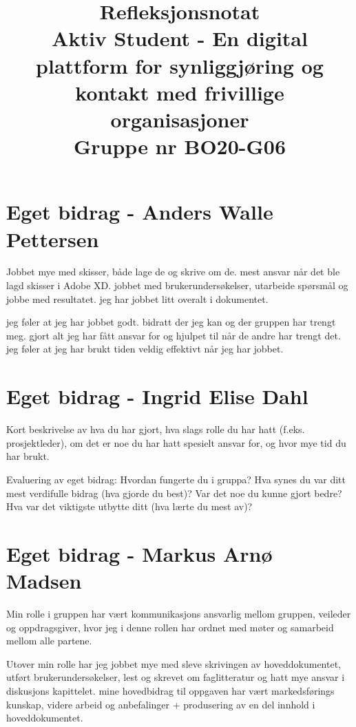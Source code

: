 \documentclass[11pt,a4paper]{report}
\begin{document}
\title{
Refleksjonsnotat \\
\vspace{2cm}
Aktiv Student - En digital plattform for synliggjøring og kontakt med frivillige organisasjoner\\
Gruppe nr BO20-G06
}

\maketitle

\section*{Eget bidrag - Anders Walle Pettersen}
Jobbet mye med skisser, både lage de og skrive om de. mest ansvar når det ble lagd skisser i Adobe XD. jobbet med brukerundersøkelser, utarbeide spørsmål og jobbe med resultatet. jeg har jobbet litt overalt i dokumentet. 

jeg føler at jeg har jobbet godt. bidratt der jeg kan og der gruppen har trengt meg. gjort alt jeg har fått ansvar for og hjulpet til når de andre har trengt det. jeg føler at jeg har brukt tiden veldig effektivt når jeg har jobbet. 


\section*{Eget bidrag - Ingrid Elise Dahl}

Kort beskrivelse av hva du har gjort, hva slags rolle du har hatt (f.eks. prosjektleder), om det er noe du har hatt spesielt ansvar for, og hvor mye tid du har  brukt.

Evaluering av eget bidrag: Hvordan fungerte du i gruppa? Hva synes du var ditt mest verdifulle bidrag (hva gjorde du best)? Var det noe du kunne gjort bedre? Hva var det viktigste utbytte ditt (hva lærte du mest av)? 

\section*{Eget bidrag - Markus Arnø Madsen}

Min rolle i gruppen har vært kommunikasjons ansvarlig mellom gruppen, veileder og oppdragsgiver, hvor jeg i denne rollen har ordnet med møter og samarbeid mellom alle partene.

Utover min rolle har jeg jobbet mye med sleve skrivingen av hoveddokumentet, utført brukerundersøkelser, lest og skrevet om faglitteratur og hatt mye ansvar i diskusjons kapittelet.
mine hovedbidrag til oppgaven har vært markedsførings kunskap, videre arbeid og anbefalinger + produsering av en del innhold i hoveddokumentet.
\end{document}
